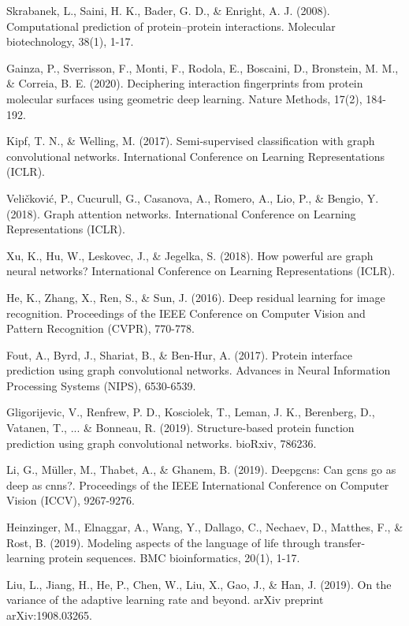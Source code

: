 \documentclass[conference]{IEEEtran}
\begin{document}

\begin{thebibliography}{00}
 Skrabanek, L., Saini, H. K., Bader, G. D., \& Enright, A. J. (2008). Computational prediction of protein–protein interactions. Molecular biotechnology, 38(1), 1-17.

 Gainza, P., Sverrisson, F., Monti, F., Rodola, E., Boscaini, D., Bronstein, M. M., \& Correia, B. E. (2020). Deciphering interaction fingerprints from protein molecular surfaces using geometric deep learning. Nature Methods, 17(2), 184-192.

 Kipf, T. N., \& Welling, M. (2017). Semi-supervised classification with graph convolutional networks. International Conference on Learning Representations (ICLR).

 Veličković, P., Cucurull, G., Casanova, A., Romero, A., Lio, P., \& Bengio, Y. (2018). Graph attention networks. International Conference on Learning Representations (ICLR).

 Xu, K., Hu, W., Leskovec, J., \& Jegelka, S. (2018). How powerful are graph neural networks? International Conference on Learning Representations (ICLR).

 He, K., Zhang, X., Ren, S., \& Sun, J. (2016). Deep residual learning for image recognition. Proceedings of the IEEE Conference on Computer Vision and Pattern Recognition (CVPR), 770-778.

 Fout, A., Byrd, J., Shariat, B., \& Ben-Hur, A. (2017). Protein interface prediction using graph convolutional networks. Advances in Neural Information Processing Systems (NIPS), 6530-6539.

 Gligorijevic, V., Renfrew, P. D., Kosciolek, T., Leman, J. K., Berenberg, D., Vatanen, T., ... \& Bonneau, R. (2019). Structure-based protein function prediction using graph convolutional networks. bioRxiv, 786236.

 Li, G., Müller, M., Thabet, A., \& Ghanem, B. (2019). Deepgcns: Can gcns go as deep as cnns?. Proceedings of the IEEE International Conference on Computer Vision (ICCV), 9267-9276.

 Heinzinger, M., Elnaggar, A., Wang, Y., Dallago, C., Nechaev, D., Matthes, F., \& Rost, B. (2019). Modeling aspects of the language of life through transfer-learning protein sequences. BMC bioinformatics, 20(1), 1-17.

 Liu, L., Jiang, H., He, P., Chen, W., Liu, X., Gao, J., \& Han, J. (2019). On the variance of the adaptive learning rate and beyond. arXiv preprint arXiv:1908.03265.

\end{thebibliography}
\end{document}
